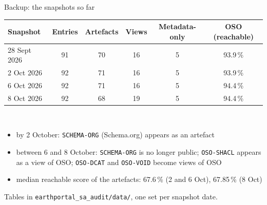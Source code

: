 \documentclass[aspectratio=169,10pt]{beamer}
\newcommand{\evidence}[1]{{\scriptsize\color{dtgrey}#1}}
\newcommand{\code}[1]{{\color{dtblue}\texttt{#1}}}
\begin{document}
\begin{frame}{Backup: the snapshots so far}
  \small
  \begin{tabular}{@{}l c c c c c@{}}
    \toprule
    Snapshot & Entries & Artefacts & Views & Metadata-only & OSO (reachable)\\
    \midrule
    28 Sept 2026 & 91 & 70 & 16 & 5 & 93.9\,\%\\
    2 Oct 2026 & 92 & 71 & 16 & 5 & 93.9\,\%\\
    6 Oct 2026 & 92 & 71 & 16 & 5 & 94.4\,\%\\
    8 Oct 2026 & 92 & 68 & 19 & 5 & 94.4\,\%\\
    \bottomrule
  \end{tabular}\\[10pt]
  \begin{itemize}
    \item by 2 October: \code{SCHEMA-ORG} (Schema.org) appears as an artefact
    \item between 6 and 8 October: \code{SCHEMA-ORG} is no longer public; \code{OSO-SHACL} appears as a
          view of OSO; \code{OSO-DCAT} and \code{OSO-VOID} become views of OSO
    \item median reachable score of the artefacts: 67.6\,\% (2 and 6 Oct), 67.85\,\% (8 Oct)
  \end{itemize}
  \vfill
  \evidence{Tables in \code{earthportal\_sa\_audit/data/}, one set per snapshot date.}
\end{frame}
\end{document}
